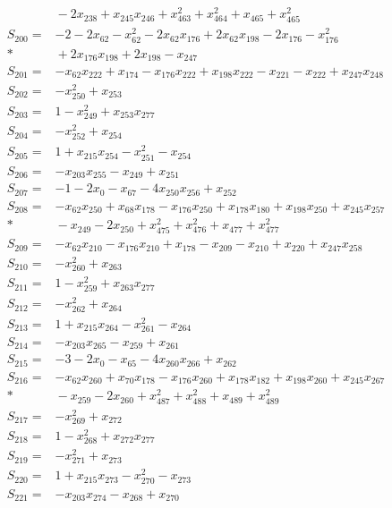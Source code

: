 \begin{align*}
&{}-2x_{238}+x_{245}x_{246}+x_{463}^{2}+x_{464}^{2}+x_{465}+x_{465}^{2}\\[3pt]
S_{200}={}&-2-2x_{62}-x_{62}^{2}-2x_{62}x_{176}+2x_{62}x_{198}-2x_{176}-x_{176}^{2}\\*
&{}+2x_{176}x_{198}+2x_{198}-x_{247}\\[3pt]
S_{201}={}&-x_{62}x_{222}+x_{174}-x_{176}x_{222}+x_{198}x_{222}-x_{221}-x_{222}+x_{247}x_{248}\\[3pt]
S_{202}={}&-x_{250}^{2}+x_{253}\\[3pt]
S_{203}={}&1-x_{249}^{2}+x_{253}x_{277}\\[3pt]
S_{204}={}&-x_{252}^{2}+x_{254}\\[3pt]
S_{205}={}&1+x_{215}x_{254}-x_{251}^{2}-x_{254}\\[3pt]
S_{206}={}&-x_{203}x_{255}-x_{249}+x_{251}\\[3pt]
S_{207}={}&-1-2x_{0}-x_{67}-4x_{250}x_{256}+x_{252}\\[3pt]
S_{208}={}&-x_{62}x_{250}+x_{68}x_{178}-x_{176}x_{250}+x_{178}x_{180}+x_{198}x_{250}+x_{245}x_{257}\\*
&{}-x_{249}-2x_{250}+x_{475}^{2}+x_{476}^{2}+x_{477}+x_{477}^{2}\\[3pt]
S_{209}={}&-x_{62}x_{210}-x_{176}x_{210}+x_{178}-x_{209}-x_{210}+x_{220}+x_{247}x_{258}\\[3pt]
S_{210}={}&-x_{260}^{2}+x_{263}\\[3pt]
S_{211}={}&1-x_{259}^{2}+x_{263}x_{277}\\[3pt]
S_{212}={}&-x_{262}^{2}+x_{264}\\[3pt]
S_{213}={}&1+x_{215}x_{264}-x_{261}^{2}-x_{264}\\[3pt]
S_{214}={}&-x_{203}x_{265}-x_{259}+x_{261}\\[3pt]
S_{215}={}&-3-2x_{0}-x_{65}-4x_{260}x_{266}+x_{262}\\[3pt]
S_{216}={}&-x_{62}x_{260}+x_{70}x_{178}-x_{176}x_{260}+x_{178}x_{182}+x_{198}x_{260}+x_{245}x_{267}\\*
&{}-x_{259}-2x_{260}+x_{487}^{2}+x_{488}^{2}+x_{489}+x_{489}^{2}\\[3pt]
S_{217}={}&-x_{269}^{2}+x_{272}\\[3pt]
S_{218}={}&1-x_{268}^{2}+x_{272}x_{277}\\[3pt]
S_{219}={}&-x_{271}^{2}+x_{273}\\[3pt]
S_{220}={}&1+x_{215}x_{273}-x_{270}^{2}-x_{273}\\[3pt]
S_{221}={}&-x_{203}x_{274}-x_{268}+x_{270}\\[3pt]

\end{align*}
